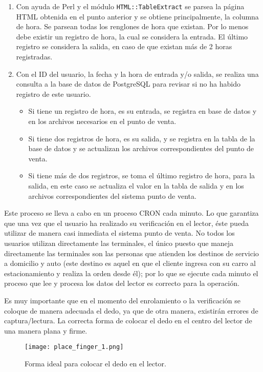 \begin{enumerate}
 \item Con ayuda de Perl y el módulo \texttt{HTML::TableExtract} se parsea la página HTML obtenida en el punto anterior y se obtiene principalmente, la columna de hora. Se parsean todas los renglones de hora que existan. Por lo menos debe existir un registro de hora, la cual se considera la entrada. El último registro se considera la salida, en caso de que existan más de 2 horas registradas.
 \item Con el ID del usuario, la fecha y la hora de entrada y/o salida, se realiza una consulta a la base de datos de PostgreSQL para revisar si no ha habido registro de este usuario.
 \begin{itemize}
  \item Si tiene un registro de hora, es su entrada, se registra en base de datos y en los archivos necesarios en el punto de venta.
  \item Si tiene dos registros de hora, es su salida, y se registra en la tabla de la base de datos y se actualizan los archivos correspondientes del punto de venta.
  \item Si tiene más de dos registros, se toma el último registro de hora, para la salida, en este caso se actualiza el valor en la tabla de salida y en los archivos correspondientes del sistema punto de venta.
 \end{itemize}

\end{enumerate}

Este proceso se lleva a cabo en un proceso CRON cada minuto. Lo que garantiza que una vez que el usuario ha realizado su verificación en el lector, éste pueda utilizar de manera casi inmediata el sistema punto de venta.  No todos los usuarios utilizan directamente las terminales, el único puesto que maneja directamente las terminales son las personas que atienden los destinos de servicio a domicilio y auto (este destino es aquel en que el cliente ingresa con su carro al estacionamiento y realiza la orden desde él); por lo que se ejecute cada minuto el proceso que lee y procesa los datos del lector es correcto para la operación.

Es muy importante que en el momento del enrolamiento o la verificación se coloque de manera adecuada el dedo, ya que de otra manera, existirán errores de captura/lectura. La correcta forma de colocar el dedo en el centro del lector de una manera plana y firme.

\begin{figure}[htb]
 \begin{center}
  \texttt{[image: place\_finger\_1.png]}
 \end{center}
 \caption{Forma ideal para colocar el dedo en el lector.}
 \label{fig:finger_print_10}
\end{figure}

